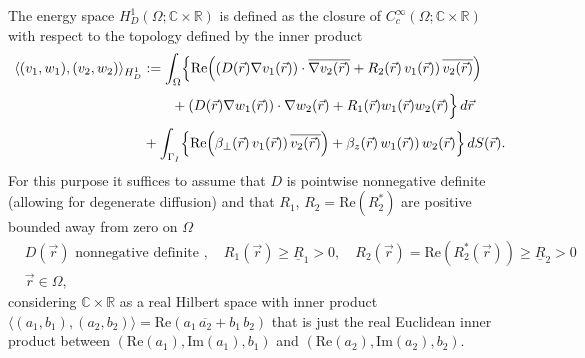 \documentclass{ws-m3as}
\renewcommand\Re{\mathrm{Re}}
\renewcommand\Im{\mathrm{Im}}
\begin{document}
The energy space $H_D^1(\Omega;\mathbb{C}\times\mathbb{R})$ is defined as the closure of $C_c^\infty(\Omega;\mathbb{C}\times\mathbb{R})$ with respect to the topology defined by the inner product
\begin{equation}\label{HD1}
\begin{aligned}
&\langle (v_1,w_1),(v_2,w_2)\rangle_{H_D^1} :=
\int_\Omega\Bigl\{ \Re\Bigl((D(\vec r) \nabla v_1(\vec r))\cdot \overline{\nabla v_2(\vec r)}
+R_2(\vec r)\,v_1(\vec r))\, \overline{v_2(\vec r)}\Bigr)\\    
&\phantom{\langle (v_1,w_1),(v_2,w_2)\rangle := \int_\Omega\Bigl(}
+(D(\vec r) \nabla w_1(\vec r))\cdot \nabla w_2(\vec r)
+R_1(\vec r) w_1(\vec r)w_2(\vec r)\Bigr\}\, d \vec r\\
&\phantom{\langle (v_1,w_1),(v_2,w_2)\rangle :=}
+\int_{\Gamma_I}\Bigl\{\Re\Bigl(\beta_\perp(\vec r)\,v_1(\vec r))\, \overline{v_2(\vec r)}\Bigr)
+\beta_z(\vec r)\,w_1(\vec r))\, w_2(\vec r)\Bigr\}\, dS(\vec r).
\end{aligned}
\end{equation}
For this purpose it suffices to assume that $D$ is pointwise nonnegative definite (allowing for degenerate diffusion) and that $R_1$, $R_2=\Re(R_2^*)$ are positive bounded away from zero on $\Omega$
\begin{equation}\label{definiteness}
\begin{aligned}
&D(\vec r)\text{ nonnegative definite }, \quad 
R_1(\vec r)\geq \underline{R}_1>0, \quad
R_2(\vec r)=\Re(R_2^*(\vec r))\geq \underline{R}_2>0\\
&\vec r\in\Omega,
\end{aligned}
\end{equation}
considering $\mathbb{C}\times\mathbb{R}$ as a real Hilbert space with inner product
$\langle (a_1,b_1),(a_2,b_2)\rangle =\Re(a_1\,\overline{a_2}+b_1\,b_2)$ that is just the real Euclidean inner product between $(\Re(a_1),\Im(a_1),b_1)$ and $(\Re(a_2),\Im(a_2),b_2)$.  
\end{document}
